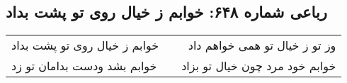 \begin{center}
\section*{رباعی شماره ۶۴۸: خوابم ز خیال روی تو پشت بداد}
\label{sec:0648}
\begin{longtable}{l p{0.5cm} r}
خوابم ز خیال روی تو پشت بداد
&&
وز تو ز خیال تو همی خواهم داد
\\
خوابم بشد ودست بدامان تو زد
&&
خوابم خود مرد چون خیال تو بزاد
\\
\end{longtable}
\end{center}
